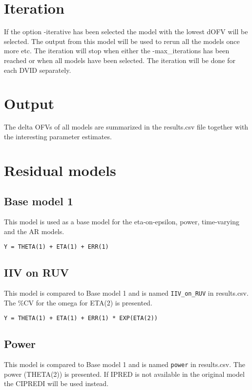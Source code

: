 \section{Iteration}
If the option -iterative has been selected the model with the lowest dOFV will be selected. The output from this model
will be used to rerun all the models once more etc. The iteration will stop when either the -max\_iterations has been
reached or when all models have been selected. The iteration will be done for each DVID separately.

\section{Output}
The delta OFVs of all models are summarized in the results.csv file together with the interesting parameter estimates.

\section{Residual models}

\subsection{Base model 1}
This model is used as a base model for the eta-on-epsilon, power, time-varying and the AR models.

\begin{verbatim}
Y = THETA(1) + ETA(1) + ERR(1)
\end{verbatim}

\subsection{IIV on RUV}
This model is compared to Base model 1 and is named \verb|IIV_on_RUV| in results.csv. The \%CV for the omega for ETA(2) is presented.

\begin{verbatim}
Y = THETA(1) + ETA(1) + ERR(1) * EXP(ETA(2))
\end{verbatim}

\subsection{Power}
This model is compared to Base model 1 and is named \verb|power| in results.csv. The power (THETA(2)) is presented.
If IPRED is not available in the original model the CIPREDI will be used instead.

